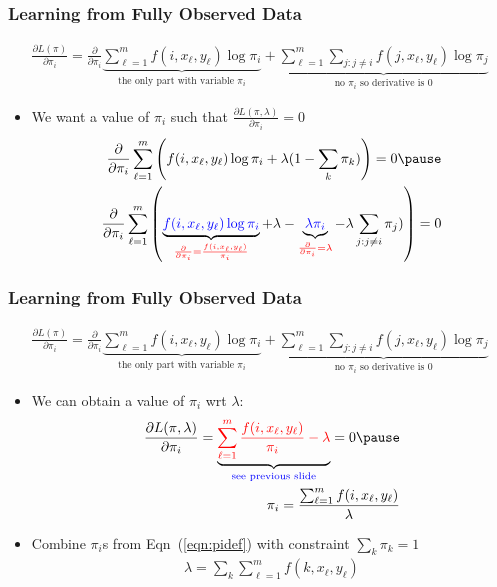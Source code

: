 \begin{frame}
\frametitle{Learning from Fully Observed Data}
{\small\begin{eqnarray*} \frac{\partial L(\pi)}{\partial \pi_i} = \frac{\partial }{\partial \pi_i} \underbrace{\sum_{\ell=1}^m f(i,x_\ell,y_\ell) \log \pi_i}_{\textrm{the only part with variable $\pi_i$}} + \underbrace{\sum_{\ell=1}^m \sum_{j : j \neq i}  f(j,x_\ell,y_\ell) \log \pi_j}_{\textrm{no $\pi_i$ so derivative is $0$}} \end{eqnarray*}}
\begin{itemize}[<+->]
\item We want a value of $\pi_i$ such that $\frac{\partial L(\pi, \lambda)}{\partial \pi_i} = 0$ \pause
\begin{eqnarray*}
\frac{\partial }{\partial \pi_i} \sum_{\ell=1}^m \left( f(i,x_\ell,y_\ell) \log \pi_i + \lambda ( 1 - \sum_k \pi_k ) \right) = 0 \pause \\
\frac{\partial }{\partial \pi_i} \sum_{\ell=1}^m \left( \underbrace{\textcolor{blue}{f(i,x_\ell,y_\ell) \log \pi_i}}_{\textcolor{red}{\frac{\partial }{\partial \pi_i}=\frac{f(i,x_\ell,y_\ell)}{\pi_i}}} + \lambda - \underbrace{\textcolor{blue}{\lambda \pi_i}}_{\textcolor{red}{\frac{\partial }{\partial \pi_i}=\lambda}} - \lambda \sum_{j : j \neq i} \pi_j ) \right) = 0 
\end{eqnarray*}
\end{itemize}
\end{frame}

\begin{frame}
\frametitle{Learning from Fully Observed Data}
{\small\begin{eqnarray*} \frac{\partial L(\pi)}{\partial \pi_i} = \frac{\partial }{\partial \pi_i} \underbrace{\sum_{\ell=1}^m f(i,x_\ell,y_\ell) \log \pi_i}_{\textrm{the only part with variable $\pi_i$}} + \underbrace{\sum_{\ell=1}^m \sum_{j : j \neq i}  f(j,x_\ell,y_\ell) \log \pi_j}_{\textrm{no $\pi_i$ so derivative is $0$}} \end{eqnarray*}}
\begin{itemize}[<+->]
\item We can obtain a value of $\pi_i$ wrt $\lambda$: \pause
\begin{eqnarray}
\frac{\partial L(\pi, \lambda)}{\partial \pi_i} = \underbrace{\textcolor{red}{\sum_{\ell=1}^m \frac{f(i,x_\ell,y_\ell)}{\pi_i} - \lambda}}_{\textrm{\textcolor{blue}{see previous slide}}} = 0 \nonumber \pause \\
\pi_i = \frac{\sum_{\ell=1}^m f(i, x_\ell, y_\ell)}{\lambda} \label{eqn:pidef}
\end{eqnarray}
\item Combine $\pi_i$s from Eqn~(\ref{eqn:pidef}) with constraint $\sum_k \pi_k = 1$
\begin{eqnarray*}
\lambda = \sum_k \sum_{\ell=1}^m f(k, x_\ell, y_\ell)
\end{eqnarray*}
\end{itemize}
\end{frame}

